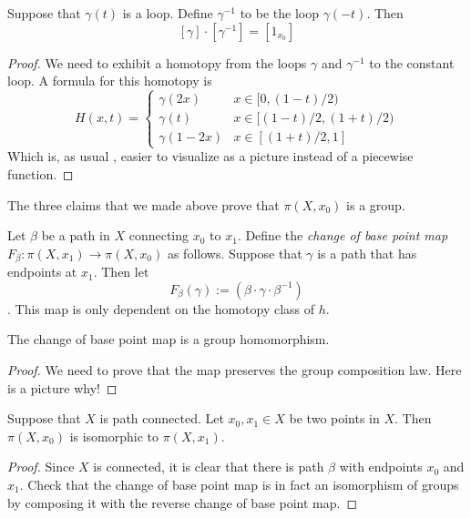 \begin{doubledtuftepage}
\begin{claim}
	Suppose that $\gamma(t)$ is a loop. Define $\gamma^{-1}$ to be the loop $\gamma(-t)$. Then 
	\[[\gamma]\cdot[\gamma^{-1}]=[1_{x_0}]\]
\end{claim}
\begin{proof}
	We need to exhibit a homotopy from the loops $\gamma$ and $\gamma^{-1}$ to the constant loop. A formula for this homotopy is 
	\[
		H(x,  t)=\left\{\begin{array}{cc}
		                	\gamma(2x) & x\in [0,  (1-t)/2)\\
		                	\gamma(t) & x\in [(1-t)/2, (1+t)/2)\\
		                	\gamma(1-2x) & x\in  [(1+t)/2,  1]
		                \end{array}\right.
	\]
	Which is,  as usual ,  easier to visualize as a picture instead of a piecewise function. 

\end{proof}

The three claims that we made above prove that $\pi(X,  x_0)$ is a group. 
\begin{definition}
	Let $\beta$ be a path in $X$ connecting $x_0$ to $x_1$. Define the \emph{change of base point map} $F_\beta: \pi(X,  x_1)\to \pi(X,  x_0)$ as follows. Suppose that $\gamma$ is a path that has endpoints at $x_1$. Then let 
	\[F_\beta(\gamma):=(\beta\cdot \gamma\cdot \beta^{-1})\].
	This map is only dependent on the homotopy class of $h$. 
\end{definition}
\begin{claim}
	The change of base point map is a group homomorphism. 
\end{claim}
\begin{proof}
	We need to prove that the map preserves the group composition law. Here is a picture why!
	\vspace{4cm}
\end{proof}

\begin{claim}
	Suppose that $X$ is path connected. Let $x_0,  x_1\in X$ be two points in $X$. Then $\pi(X,  x_0)$ is isomorphic to $\pi(X,  x_1)$. 
\end{claim}
\begin{proof}
	Since $X$ is connected,  it is clear that there is path $\beta$ with endpoints $x_0$ and $x_1$. Check that the change of base point map is in fact an isomorphism of groups by composing it with the reverse change of base point map. 
\end{proof}

\end{doubledtuftepage}

